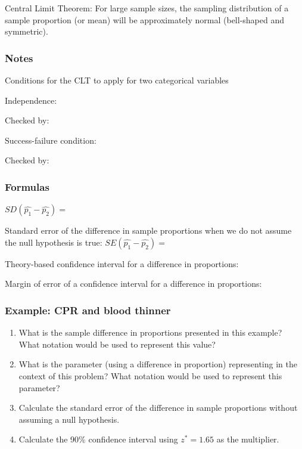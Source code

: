 \documentclass[
]{report}
\newcommand{\rgs}{\vspace{12pt}} %
\newcommand{\rgi}{\hspace{24pt}}  %
\begin{document}
Central Limit Theorem: For large sample sizes, the sampling distribution of a sample proportion (or mean) will be approximately normal (bell-shaped and symmetric).

\hypertarget{notes-23}{%
\subsubsection*{Notes}\label{notes-23}}

Conditions for the CLT to apply for two categorical variables

\rgi Independence:
\rgs

\rgi \rgi Checked by:
\rgs

\rgi Success-failure condition:
\rgs

\rgi \rgi Checked by:
\rgs

\hypertarget{formulas-7}{%
\subsubsection*{Formulas}\label{formulas-7}}

\(SD(\hat{p_1} - \hat{p_2})=\)
\rgs

Standard error of the difference in sample proportions when we do not assume the null hypothesis is true:
\(SE(\hat{p_1} - \hat{p_2})=\)
\rgs

Theory-based confidence interval for a difference in proportions:
\rgs

Margin of error of a confidence interval for a difference in proportions:
\rgs

\hypertarget{example-cpr-and-blood-thinner-3}{%
\subsubsection*{Example: CPR and blood thinner}\label{example-cpr-and-blood-thinner-3}}

\begin{enumerate}
\def\labelenumi{\arabic{enumi}.}
\item
  What is the sample difference in proportions presented in this example? What notation would be used to represent this value?
  \rgs
\item
  What is the parameter (using a difference in proportion) representing in the context of this problem? What notation would be used to represent this parameter?
  \rgs
  \rgs
\item
  Calculate the standard error of the difference in sample proportions without assuming a null hypothesis.
  \rgs
  \rgs
\item
  Calculate the 90\% confidence interval using \(z^*=1.65\) as the multiplier.
  \rgs
  \rgs
\end{enumerate}
\end{document}
